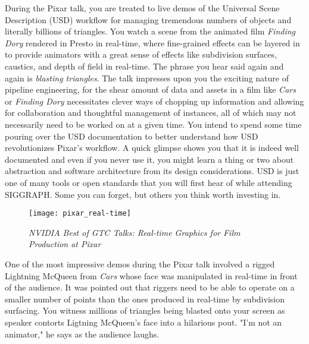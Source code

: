 \documentclass[../main.tex]{subfiles}
\begin{document}
During the Pixar talk, you are treated to live demos of the Universal Scene Description  (USD) workflow for managing tremendous numbers of objects and literally billions of triangles. You watch a scene from the animated film \textit{Finding Dory} rendered in Presto in real-time, where fine-grained effects can be layered in to provide animators with a great sense of effects like subdivision surfaces, caustics, and depth of field in real-time. The phrase you hear said again and again is \textit{blasting triangles}. The talk impresses upon you the exciting nature of pipeline engineering, for the shear amount of data and assets in a film like \textit{Cars} or \textit{Finding Dory} necessitates clever ways of chopping up information and allowing for collaboration and thoughtful management of instances, all of which may not necessarily need to be worked on at a given time. You intend to spend some time pouring over the USD documentation to better understand how USD revolutionizes Pixar's workflow. A quick glimpse shows you that it is indeed well documented and even if you never use it, you might learn a thing or two about abstraction and software architecture from its design considerations. USD is just one of many tools or open standards that you will first hear of while attending SIGGRAPH. Some you can forget, but others you think worth investing in.


\begin{figure}[h!]
	\centering
	\texttt{[image: pixar\_real-time]}
	\caption*{\textit{NVIDIA Best of GTC Talks: Real-time Graphics for Film Production at Pixar}}
\end{figure}

One of the most impressive demos during the Pixar talk involved a rigged Lightning McQueen from \textit{Cars} whose face was manipulated in real-time in front of the audience. It was pointed out that riggers need to be able to operate on a smaller number of points than the ones produced in real-time by subdivision surfacing. You witness millions of triangles being blasted onto your screen as speaker  contorts Ligtning McQueen's face into a hilarious pout. "I'm not an animator," he says as the audience laughs.
\end{document}
